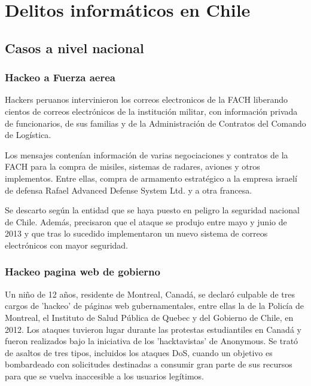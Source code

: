\chapter{Delitos informáticos en Chile}
\section{Casos a nivel nacional}

\subsection{Hackeo a Fuerza aerea}
Hackers peruanos intervinieron los correos electronicos de la FACH liberando cientos de correos electrónicos de la institución militar, con información privada de funcionarios, de sus familias y de la Administración de Contratos del Comando de Logística.

Los mensajes contenían información de varias negociaciones y contratos de la FACH para la compra de misiles, sistemas de radares, aviones y otros implementos. Entre ellas, compra de armamento estratégico a la empresa israelí de defensa Rafael Advanced Defense System Ltd. y a otra francesa.

Se descarto según la entidad que se haya puesto en peligro la seguridad nacional de Chile. Además, precisaron que el ataque se produjo entre mayo y junio de 2013 y que tras lo sucedido implementaron un nuevo sistema de correos electrónicos con mayor seguridad.\cite{aerea}

\subsection{Hackeo pagina web de gobierno}
Un niño de 12 años, residente de Montreal, Canadá, se declaró culpable de tres cargos de 'hackeo' de páginas web gubernamentales, entre ellas la de la Policía de Montreal, el Instituto de Salud Pública de Quebec y del Gobierno de Chile, en 2012.
Los ataques tuvieron lugar durante las protestas estudiantiles en Canadá y fueron realizados bajo la iniciativa de los 'hacktavistas' de Anonymous. Se trató de asaltos de tres tipos, incluidos los ataques DoS, cuando un objetivo es bombardeado con solicitudes destinadas a consumir gran parte de sus recursos para que se vuelva inaccesible a los usuarios legítimos.\cite{nino}

